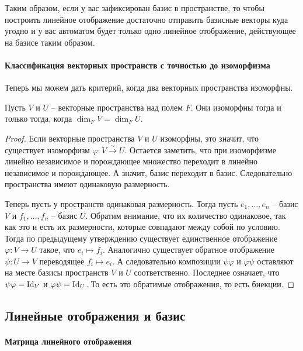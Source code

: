 Таким образом, если у вас зафиксирован базис в пространстве, то чтобы построить линейное отображение достаточно отправить базисные векторы куда угодно и у вас автоматом будет только одно линейное отображение, действующее на базисе таким образом.

\paragraph{Классификация векторных пространств с точностью до изоморфизма}

Теперь мы можем дать критерий, когда два векторных пространства изоморфны.

\begin{claim}
\label{claim::VectorClassific}
Пусть $V$ и $U$ -- векторные пространства над полем $F$.
Они изоморфны тогда и только тогда, когда $\dim_F V = \dim_F U$.
\end{claim}
\begin{proof}
Если векторные пространства $V$  и $U$ изоморфны, это значит, что существует изоморфизм $\varphi\colon V\stackrel{\sim}{\longrightarrow} U$.
Остается заметить, что при изоморфизме линейно независимое и порождающее множество переходит в линейно независимое и порождающее.
А значит, базис переходит в базис.
Следовательно пространства имеют одинаковую размерность.

Теперь пусть у пространств одинаковая размерность.
Тогда пусть $e_1,\ldots,e_n$ -- базис $V$ и $f_1,\ldots,f_n$ -- базис $U$.
Обратим внимание, что их количество одинаковое, так как это и есть их размерности, которые совпадают между собой по условию.
Тогда по предыдущему утверждению существует единственное отображение $\varphi\colon V\to U$ такое, что $e_i\mapsto f_i$.
Аналогично существует обратное отображение $\psi\colon U\to V$ переводящее $f_i\mapsto e_i$.
А следовательно композиции $\psi\varphi$ и $\varphi\psi$ оставляют на месте базисы пространств $V$ и $U$ соответственно.
Последнее означает, что  $\psi\varphi = \operatorname{Id}_V$ и $\varphi\psi = \operatorname{Id}_U$.
То есть это обратимые отображения, то есть биекции.
\end{proof}

\subsection{Линейные отображения и базис}

\paragraph{Матрица линейного отображения}

